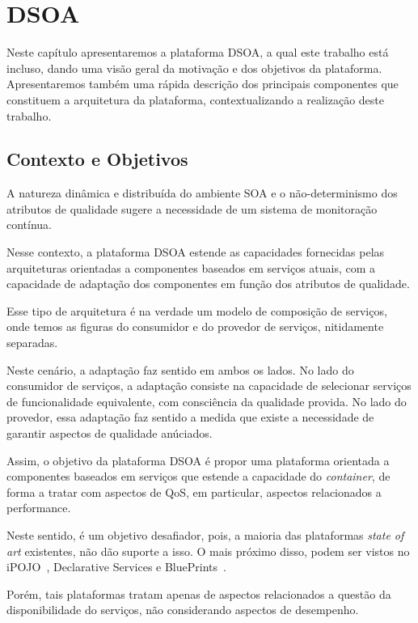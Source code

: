 \chapter{DSOA}
\label{ch:3}
Neste capítulo apresentaremos a plataforma DSOA, a qual este trabalho está incluso, dando uma visão geral da motivação e dos objetivos da plataforma. Apresentaremos também uma rápida descrição dos principais componentes que constituem a arquitetura da plataforma, contextualizando a realização deste trabalho.

\section{Contexto e Objetivos}
\label{sec:dsoa_intro}

A natureza dinâmica e distribuída do ambiente SOA e o não-determinismo dos atributos de qualidade sugere a necessidade de um sistema de monitoração contínua.

Nesse contexto, a plataforma DSOA estende as capacidades fornecidas pelas arquiteturas orientadas a componentes baseados em serviços atuais, com a capacidade de adaptação dos componentes em função dos atributos de qualidade. 

Esse tipo de arquitetura é na verdade um modelo de composição de serviços, onde temos as figuras do consumidor e do provedor de serviços, nitidamente separadas.

Neste cenário, a adaptação faz sentido em ambos os lados. No lado do consumidor de serviços, a adaptação consiste na capacidade de selecionar serviços de funcionalidade equivalente, com consciência da qualidade provida. No lado do provedor, essa adaptação faz sentido a medida que existe a necessidade de garantir aspectos de qualidade anúciados.

Assim, o objetivo da plataforma DSOA é propor uma plataforma orientada a componentes baseados em serviços que estende a capacidade do \textit{container}, de forma a tratar com aspectos de QoS, em particular, aspectos relacionados a performance.

Neste sentido, é um objetivo desafiador, pois, a maioria das plataformas \textit{state of art} existentes, não dão suporte a isso. O mais próximo disso, podem ser vistos no iPOJO~\cite{ipojo}, Declarative Services e BluePrints~\cite{blueprint}. 

Porém, tais plataformas tratam apenas de aspectos relacionados a questão da disponibilidade do serviços, não considerando aspectos de desempenho.

